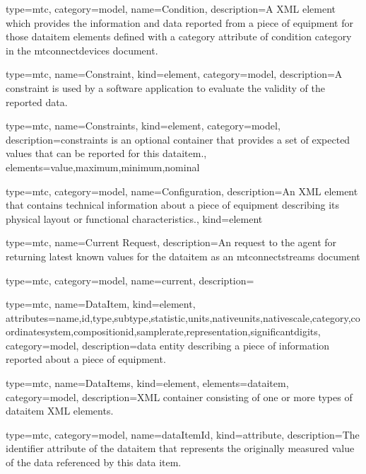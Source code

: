 {
  type=mtc,
  category=model,
  name={Condition},
  description={A XML element which provides the information and data reported from a piece of equipment for those \gls{dataitem} elements defined with a \gls{category} attribute of \gls{condition category} in the \glspl{mtconnectdevice} document.}
}


{
  type=mtc,
  name={Constraint},
  kind={element},
  category=model,
  description={A \gls{constraint} is used by a software application to evaluate the validity of the reported data.}
}

{
  type=mtc,
  name={Constraints},
  kind={element},
  category=model,
  description={\gls{constraints} is an optional container that provides a set of expected values that can be reported for this \gls{dataitem}.},
  elements={\gls{value},\gls{maximum},\gls{minimum},\gls{nominal}}
}


{
  type=mtc,
  category=model,
  name={Configuration},
  description={An XML element that contains technical information about a piece of equipment describing its physical layout or functional characteristics.},
  kind={element}
}



{
  type=mtc,
  name={Current Request},
  description={An  request to the \gls{agent} for returning latest known values for the \gls{dataitem} as an \glspl{mtconnectstream}  document}
}


{
  type=mtc,
  category=model,
  name={current},
  description={}
}


{
  type=mtc,
  name={DataItem},
  kind={element},
  attributes={\gls{name},\gls{id},\gls{type},\gls{subtype},\gls{statistic},\gls{units},\gls{nativeunits},\gls{nativescale},\gls{category},\gls{coordinatesystem},\gls{compositionid},\gls{samplerate},\gls{representation},\gls{significantdigits}},
  category=model,
  description={\gls{data entity} describing a piece of information reported about a piece of equipment.}
}


{
  type=mtc,
  name={DataItems},
  kind={element},
  elements={\gls{dataitem}},
  category=model,
  description={XML container consisting of one or more types of \gls{dataitem} XML elements.}
}

{
  type=mtc,
  category=model,
  name={dataItemId},
  kind={attribute},
  description={The identifier attribute of the \gls{dataitem} that represents the originally measured value of the data referenced by this data item.}
}


